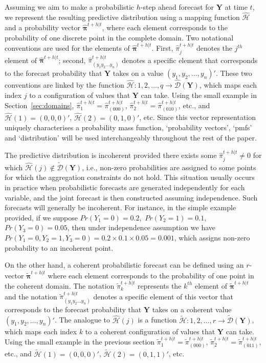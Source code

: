 \documentclass[a4paper,review,12pt,authoryear]{elsarticle}
\newcommand{\bY}{\mathbf{Y}}
\newcommand{\bpi}{\bm{\pi}}
\theoremstyle{definition}
\begin{document}
  Assuming we aim to make a probabilistic $h$-step ahead forecast for $\bY$ at time $t$, we represent the resulting predictive distribution using a mapping function $\hat{\mathcal{H}}$ and a probability vector $\hat{\bpi}^{t+h|t}$, where each element corresponds to the probability of one discrete point in the complete domain.
  Two notational conventions are used for the elements of $\hat{\bpi}^{t+h|t}$.
  First, $\hat{\pi}_j^{t+h|t}$ denotes the $j^{th}$ element of $\hat{\bpi}^{t+h|t}$;
  second, $\hat{\pi}_{(y_1 y_2 \dots y_n)}^{t+h|t}$ denotes a specific element that corresponds to the forecast probability that $\bY$ takes on a value $(y_1,y_2,\dots,y_n)'$. These two conventions are linked by the function $\hat{\mathcal{H}}:{1,2,\dots,q}\rightarrow\hat{\mathcal{D}}(\bY)$, which maps each index $j$ to a configuration of values that $\bY$ can take.
  Using the small example in Section~\ref{sec:domains}, $\hat{\pi}_1^{t+h|t}=\hat{\pi}_{(000)}^{t+h|t}$, $\hat{\pi}_2^{t+h|t}=\hat{\pi}_{(010)}^{t+h|t}$, etc., and $\hat{\mathcal{H}}(1)=(0,0,0)'$, $\hat{\mathcal{H}}(2)=(0,1,0)'$, etc. Since this vector representation uniquely characterises a probability mass function, `probability vectors', `pmfs' and `distribution' will be used interchangeably throughout the rest of the paper.

  The predictive distribution is incoherent provided there exists some $\hat{\pi}^{t+h|t}_j\neq 0$ for which $\hat{\mathcal{H}}(j)\notin\tilde{\mathcal{D}}(\bY)$, i.e., non-zero probabilities are assigned to some points for which the aggregation constraints do not hold.
  This situation usually occurs in practice when probabilistic forecasts are generated independently for each variable, and the joint forecast is then constructed assuming independence.
  Such forecasts will generally be incoherent.
  For instance, in the simple example provided, if we suppose $Pr(Y_1=0)=0.2$,~$Pr(Y_2=1)=0.1$,~$Pr(Y_3=0)=0.05$, then under independence assumption we have $Pr(Y_1=0,Y_2=1,Y_3=0)=0.2\times0.1\times0.05=0.001$, which assigns non-zero probability to an incoherent point.

  On the other hand, a coherent probabilistic forecast can be defined using an $r$-vector $\tilde{\bpi}^{t+h|t}$ where each element corresponds to the probability of one point in the coherent domain.
  The notation $\tilde{\pi}_k^{t+h|t}$ represents the $k^{th}$ element of $\tilde{\bpi}^{t+h|t}$ and the notation $\tilde{\pi}_{(y_1 y_2 \dots y_n)}^{t+h|t}$ denotes a specific element of this vector that corresponds to the forecast probability that $\bY$ takes on a coherent value $(y_1,y_2,\dots,y_n)'$.
  The analogue to $\hat{\mathcal{H}}(j)$ is a function  $\tilde{\mathcal{H}}:{1,2,\dots,r}\rightarrow\tilde{\mathcal{D}}(\bY)$, which maps each index $k$ to a coherent configuration of values that $\bY$ can take.
  Using the small example in the previous section $\tilde{\pi}_1^{t+h|t}=\tilde{\pi}_{(000)}^{t+h|t}$, $\tilde{\pi}_2^{t+h|t}=\tilde{\pi}_{(011)}^{t+h|t}$, etc., and $\tilde{\mathcal{H}}(1)=(0,0,0)'$, $\tilde{\mathcal{H}}(2)=(0,1,1)'$, etc.
\end{document}
